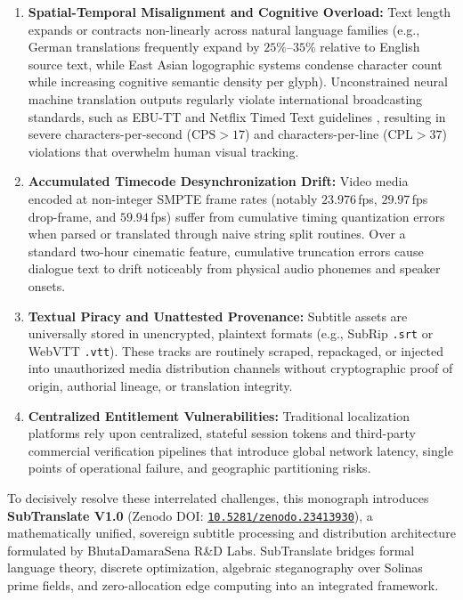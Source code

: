 \documentclass[11pt,a4paper,reqno]{article}
\newcommand{\zenodo}[1]{\href{https://doi.org/10.5281/zenodo.#1}{\nolinkurl{10.5281/zenodo.#1}}}
\theoremstyle{definition}
\theoremstyle{remark}
\begin{document}
\begin{enumerate}
    \item \textbf{Spatial-Temporal Misalignment and Cognitive Overload:} Text length expands or contracts non-linearly across natural language families (e.g., German translations frequently expand by $25\%\text{--}35\%$ relative to English source text, while East Asian logographic systems condense character count while increasing cognitive semantic density per glyph). Unconstrained neural machine translation outputs regularly violate international broadcasting standards, such as EBU-TT \cite{ebu_tech_3388} and Netflix Timed Text guidelines \cite{netflix_style_guide}, resulting in severe characters-per-second ($\text{CPS} > 17$) and characters-per-line ($\text{CPL} > 37$) violations that overwhelm human visual tracking.
    \item \textbf{Accumulated Timecode Desynchronization Drift:} Video media encoded at non-integer SMPTE frame rates (notably $23.976$\,fps, $29.97$\,fps drop-frame, and $59.94$\,fps) suffer from cumulative timing quantization errors when parsed or translated through naive string split routines. Over a standard two-hour cinematic feature, cumulative truncation errors cause dialogue text to drift noticeably from physical audio phonemes and speaker onsets.
    \item \textbf{Textual Piracy and Unattested Provenance:} Subtitle assets are universally stored in unencrypted, plaintext formats (e.g., SubRip \texttt{.srt} or WebVTT \texttt{.vtt}). These tracks are routinely scraped, repackaged, or injected into unauthorized media distribution channels without cryptographic proof of origin, authorial lineage, or translation integrity.
    \item \textbf{Centralized Entitlement Vulnerabilities:} Traditional localization platforms rely upon centralized, stateful session tokens and third-party commercial verification pipelines that introduce global network latency, single points of operational failure, and geographic partitioning risks.
\end{enumerate}

To decisively resolve these interrelated challenges, this monograph introduces \textbf{SubTranslate V1.0} (Zenodo DOI: \zenodo{23413930}), a mathematically unified, sovereign subtitle processing and distribution architecture formulated by BhutaDamaraSena R\&D Labs. SubTranslate bridges formal language theory, discrete optimization, algebraic steganography over Solinas prime fields, and zero-allocation edge computing into an integrated framework.
\end{document}
